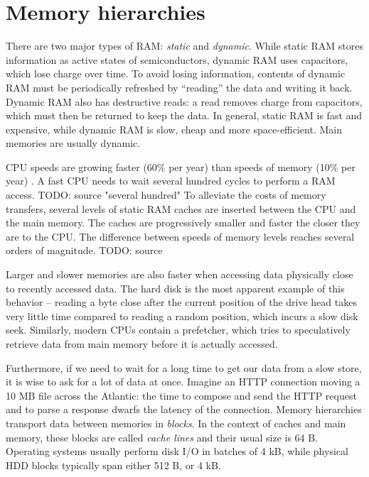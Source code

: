 \section{Memory hierarchies}
There are two major types of RAM: \emph{static} and \emph{dynamic}.
While static RAM stores information as active states of semiconductors, dynamic
RAM uses capacitors, which lose charge over time. To avoid losing information,
contents of dynamic RAM must be periodically refreshed by ``reading'' the data
and writing it back. Dynamic RAM also has destructive reads: a read removes
charge from capacitors, which must then be returned to keep the data.
In general, static RAM is fast and expensive, while dynamic RAM is slow,
cheap and more space-efficient. Main memories are usually dynamic.

CPU speeds are growing faster (60\% per year) than speeds of memory (10\% per
year) \cite{Ailamaki:2004:DAN:1316689.1316801}.
A fast CPU needs to wait several hundred cycles to perform a RAM access.
TODO: source "several hundred"
To alleviate the costs of memory transfers, several levels of static RAM
caches are inserted between the CPU and the main memory. The caches are
progressively smaller and faster the closer they are to the CPU. The difference
between speeds of memory levels reaches several orders of magnitude. TODO: source

Larger and slower memories are also faster when accessing data physically
close to recently accessed data. The hard disk is the most apparent example
of this behavior -- reading a byte close after the current position of the drive
head takes very little time compared to reading a random position, which incurs
a slow disk seek. %
Similarly, modern CPUs contain a prefetcher, which tries to speculatively
retrieve data from main memory before it is actually accessed.

Furthermore, if we need to wait for a long time to get our data from a slow
store, it is wise to ask for a lot of data at once. Imagine an HTTP connection
moving a 10 MB file across the Atlantic: the time to compose and send the HTTP
request and to parse a response dwarfs the latency of the connection.
Memory hierarchies transport data between memories in \emph{blocks}.
In the context of caches and main memory, these blocks are called
\emph{cache lines} and their usual size is 64 B.
Operating systems usually perform disk I/O in batches of 4 kB,
while physical HDD blocks typically span either 512 B, or 4 kB.

